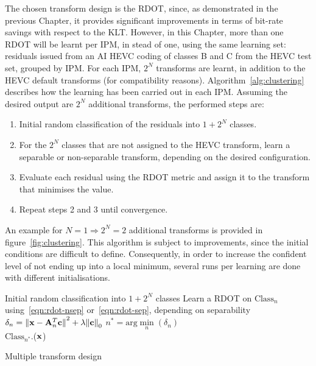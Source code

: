 \documentclass[11pt,a4paper,openright,twoside]{book}
\numberwithin{equation}{section} %
\numberwithin{figure}{section} %
\numberwithin{table}{section} %
\begin{document}
The chosen transform design is the \ac{RDOT}, since, as demonstrated in the
previous Chapter, it provides significant improvements in terms of bit-rate
savings with respect to the \ac{KLT}.
However, in this Chapter, more than one \ac{RDOT} will be learnt per \ac{IPM},
in stead of one, using the same learning set:
residuals issued from an \ac{AI} \ac{HEVC} coding of classes B and C from the
\ac{HEVC} test set, grouped by \ac{IPM}.
For each \ac{IPM}, $2^N$ transforms are learnt, in addition to the \ac{HEVC}
default transforms (for compatibility reasons).
Algorithm~\ref{alg:clustering} describes how the learning has been carried out
in each \ac{IPM}.
Assuming the desired output are $2^N$ additional transforms, the performed
steps are:
\begin{enumerate}
	\item Initial random classification of the residuals into $1+2^N$ classes.
	\item For the $2^N$ classes that are not assigned to the \ac{HEVC}
		transform, learn a separable or non-separable transform, depending on
		the desired configuration.
	\item Evaluate each residual using the RDOT metric and assign it to the
		transform that minimises the value.
	\item Repeat steps 2 and 3 until convergence.
\end{enumerate}
An example for $N=1\Rightarrow2^N=2$ additional transforms is provided in
figure~\ref{fig:clustering}.
This algorithm is subject to improvements, since the initial conditions are
difficult to define.
Consequently, in order to increase the confident level of not ending up into a
local minimum, several runs per learning are done with different initialisations.

\begin{algorithm}
	\small
	\BlankLine%
	Initial random classification into $1+2^N$ classes
	\BlankLine%
	{
			{
				Learn a \ac{RDOT} on $\text{Class}_n$
				using~\eqref{eqn:rdot-nsep} or~\eqref{eqn:rdot-sep}, depending
				on separability
			}
			{
				{
					$\delta_n =
					{\Vert \mathbf{x} - \mathbf{A}^T_n\mathbf{c}\Vert}^2 + \lambda{\Vert\mathbf{c}\Vert}_0$
				}
				$\displaystyle n^* = \text{arg}\min\limits_n(\delta_n)$\\
				$\text{Class}_{n^*}$.\append($\mathbf{x}$)
			}
	}
	\caption{Multiple transform design}
	\label{alg:clustering}
\end{algorithm}
\end{document}
